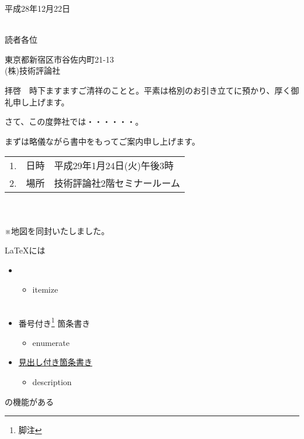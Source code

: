 \documentclass{jsarticle}
\begin{document}
\begin{flushright}
平成28年12月22日
\end{flushright}

\begin{flushleft}
\\
読者各位
\end{flushleft}

\begin{flushright}
東京都新宿区市谷佐内町21-13\\
(株)技術評論社
\end{flushright}

\begin{center}
\LARGE {}
\end{center}

\noindent
拝啓　時下ますますご清祥のことと。平素は格別のお引き立てに預かり、厚く御礼申し上げます。

さて、この度弊社では・・・・・・。

まずは略儀ながら書中をもってご案内申し上げます。


\記
\記

\begin{tabular}{rll}
1.& 日時 & 平成29年1月24日(火)午後3時 \\
2.& 場所 & 技術評論社2階セミナールーム
\end{tabular}
\\
\\
※地図を同封いたしました。
\clearpage

\LaTeX には
\begin{itemize}
  \item {}
  \begin{itemize}
    \item itemize\\
    \hrulefill\\
    \dotfill
  \end{itemize}
  \item 番号付き\footnote{脚注} 箇条書き
  \begin{itemize}
    \item enumerate
  \end{itemize}
  \item \underline{見出し付き箇条書き}
  \begin{itemize}
    \item description
  \end{itemize}
\end{itemize}
の機能がある
\end{document}
